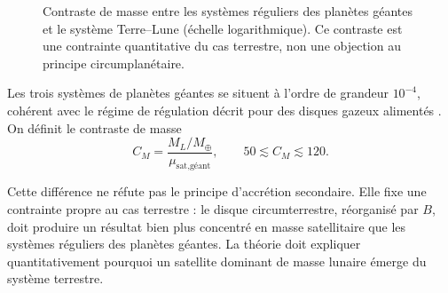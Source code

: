 \documentclass[11pt,a4paper,openany]{report}
\newcommand{\Mt}{M_{\oplus}}
\begin{document}
\begin{figure}[htbp]
\centering
{}
\caption{Contraste de masse entre les systèmes réguliers des planètes géantes et le système
Terre--Lune (échelle logarithmique). Ce contraste est une contrainte quantitative du cas
terrestre, non une objection au principe circumplanétaire.}
\label{fig:contraste}
\end{figure}

Les trois systèmes de planètes géantes se situent à l'ordre de grandeur $10^{-4}$, cohérent avec
le régime de régulation décrit pour des disques gazeux alimentés \cite{CanupWard2006}. On
définit le contraste de masse
\begin{equation}
C_M=\frac{M_L/\Mt}{\mu_{\text{sat,géant}}},
\qquad 50\lesssim C_M\lesssim 120.
\label{eq:CM}
\end{equation}

\begin{controle}
Cette différence ne réfute pas le principe d'accrétion secondaire. Elle fixe une contrainte
propre au cas terrestre : le disque circumterrestre, réorganisé par $B$, doit produire un résultat
bien plus concentré en masse satellitaire que les systèmes réguliers des planètes géantes. La
théorie doit expliquer quantitativement pourquoi un satellite dominant de masse lunaire émerge
du système terrestre.
\end{controle}
\end{document}
